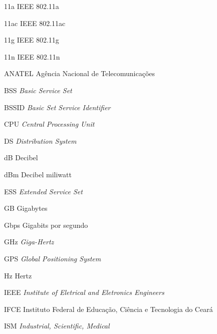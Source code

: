 \begin{siglas} \itemsep -1pt
	\item[11a] \hspace{.8cm} IEEE 802.11a
	\item[11ac] \hspace{.8cm} IEEE 802.11ac
	\item[11g] \hspace{.8cm} IEEE 802.11g
	\item[11n] \hspace{.8cm} IEEE 802.11n
	\item[ANATEL] \hspace{.8cm} Agência Nacional de Telecomunicações
	\item[BSS] \hspace{.8cm} \textit{Basic Service Set}
	\item[BSSID] \hspace{.8cm} \textit{Basic Set Service Identifier}
	\item[CPU] \hspace{.8cm} \textit{Central Processing Unit}
	\item[DS] \hspace{.8cm} \textit{Distribution System}
	\item[dB] \hspace{.8cm} Decibel
	\item[dBm] \hspace{.8cm} Decibel miliwatt
	\item[ESS] \hspace{.8cm} \textit{Extended Service Set}
	\item[GB] \hspace{.8cm} Gigabytes
	\item[Gbps] \hspace{.8cm} Gigabits por segundo
	\item[GHz] \hspace{.8cm} \textit{Giga-Hertz}
	\item[GPS] \hspace{.8cm} \textit{Global Positioning System}
	\item[Hz] \hspace{.8cm} Hertz
	\item[IEEE] \hspace{.8cm} \textit{Institute of Eletrical and Eletronics Engineers}
	\item[IFCE] \hspace{.8cm} Instituto Federal de Educação, Ciência e Tecnologia do Ceará
	\item[ISM] \hspace{.8cm} \textit{Industrial, Scientific, Medical}

\end{siglas}
